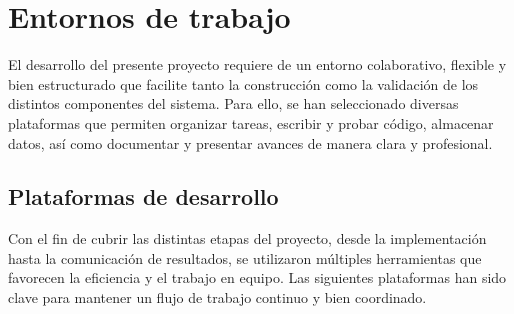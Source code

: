\section{Entornos de trabajo}

El desarrollo del presente proyecto requiere de un entorno colaborativo, flexible y bien estructurado que facilite tanto la construcción como la validación de los distintos componentes del sistema. Para ello, se han seleccionado diversas plataformas que permiten organizar tareas, escribir y probar código, almacenar datos, así como documentar y presentar avances de manera clara y profesional.

\subsection{Plataformas de desarrollo}

 Con el fin de cubrir las distintas etapas del proyecto, desde la implementación hasta la comunicación de resultados, se utilizaron múltiples herramientas que favorecen la eficiencia y el trabajo en equipo. Las siguientes plataformas han sido clave para mantener un flujo de trabajo continuo y bien coordinado.

